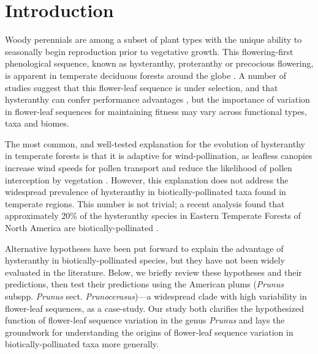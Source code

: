 \documentclass{article}[12pt]
\begin{document}
\section*{Introduction}
\noindent Woody perennials are among a subset of plant types with the unique ability to seasonally begin reproduction prior to vegetative growth. This flowering-first phenological sequence, known as hysteranthy, proteranthy or precocious flowering, is apparent in temperate deciduous forests around the globe \citep{Rathcke_1985}. A number of studies suggest that this flower-leaf sequence is under selection, and that hysteranthy can confer performance advantages \citep{Guo2014,Gougherty2018,Buonaiuto2020}, but the importance of variation in flower-leaf sequences for maintaining fitness may vary across functional types, taxa and biomes. %

\noindent The most common, and well-tested explanation for the evolution of hysteranthy in temperate forests is that it is adaptive for wind-pollination, as leafless canopies increase wind speeds for pollen transport and reduce the likelihood of pollen interception by vegetation \citep{Whitehead1969,Niklas1985}. However, this explanation does not address the widespread prevalence of hysteranthy in biotically-pollinated taxa found in temperate regions. This number is not trivial; a recent analysis found that approximately 20\% of the hysteranthy species in Eastern Temperate Forests of North America are biotically-pollinated \citep{Buonaiuto2020}. 

Alternative hypotheses have been put forward to explain the advantage of hysteranthy in biotically-pollinated species, but they have not been widely evaluated in the literature. Below, we briefly review these hypotheses and their predictions, then test their predictions using the American plums (\textit{Prunus} subspp. \textit{Prunus} sect. \textit{Prunocerasus})---a widespread clade with high variability in flower-leaf sequences, as a case-study. Our study both clarifies the hypothesized function of flower-leaf sequence variation in the genus \emph{Prunus} and lays the groundwork for understanding the origins of flower-leaf sequence variation in biotically-pollinated taxa more generally.
\end{document}
